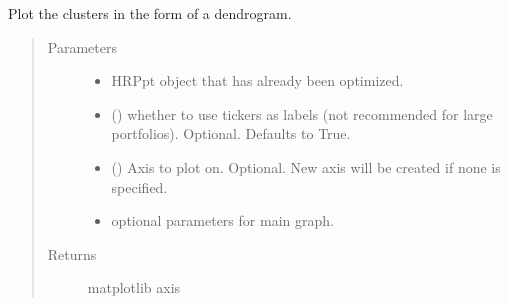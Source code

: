 \documentclass[letterpaper,10pt,english]{sphinxmanual}
\begin{document}
\begin{fulllineitems}
\label{\detokenize{dalio.util:dalio.util.plotting_utils.plot_dendrogram}}
Plot the clusters in the form of a dendrogram.
\begin{quote}\begin{description}
\item[{Parameters}] \leavevmode\begin{itemize}
\item {} 
 \textendash{} HRPpt object that has already been optimized.

\item {} 
 () \textendash{} whether to use tickers as labels (not
recommended for large portfolios). Optional. Defaults to True.

\item {} 
 (\sphinxstyleliteralemphasis{\sphinxupquote{, }}) \textendash{} Axis to plot on. Optional. New axis will
be created if none is specified.

\item {} 
 \textendash{} optional parameters for main graph.

\end{itemize}

\item[{Returns}] \leavevmode
matplotlib axis

\end{description}\end{quote}

\end{fulllineitems}

\end{document}
